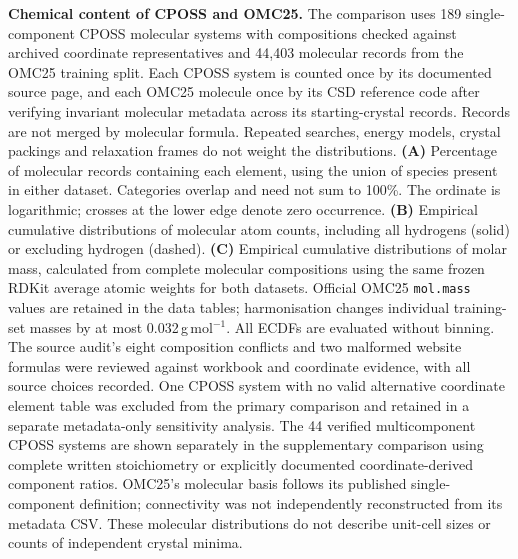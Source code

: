 \caption{\textbf{Chemical content of CPOSS and OMC25.} The comparison uses 189 single-component CPOSS molecular systems with compositions checked against archived coordinate representatives and 44,403 molecular records from the OMC25 training split. Each CPOSS system is counted once by its documented source page, and each OMC25 molecule once by its CSD reference code after verifying invariant molecular metadata across its starting-crystal records. Records are not merged by molecular formula. Repeated searches, energy models, crystal packings and relaxation frames do not weight the distributions. \textbf{(A)} Percentage of molecular records containing each element, using the union of species present in either dataset. Categories overlap and need not sum to 100\%. The ordinate is logarithmic; crosses at the lower edge denote zero occurrence. \textbf{(B)} Empirical cumulative distributions of molecular atom counts, including all hydrogens (solid) or excluding hydrogen (dashed). \textbf{(C)} Empirical cumulative distributions of molar mass, calculated from complete molecular compositions using the same frozen RDKit average atomic weights for both datasets. Official OMC25 \texttt{mol.mass} values are retained in the data tables; harmonisation changes individual training-set masses by at most 0.032\,g\,mol$^{-1}$. All ECDFs are evaluated without binning. The source audit's eight composition conflicts and two malformed website formulas were reviewed against workbook and coordinate evidence, with all source choices recorded. One CPOSS system with no valid alternative coordinate element table was excluded from the primary comparison and retained in a separate metadata-only sensitivity analysis. The 44 verified multicomponent CPOSS systems are shown separately in the supplementary comparison using complete written stoichiometry or explicitly documented coordinate-derived component ratios. OMC25's molecular basis follows its published single-component definition; connectivity was not independently reconstructed from its metadata CSV. These molecular distributions do not describe unit-cell sizes or counts of independent crystal minima.}
\label{fig:cposs_omc25_comparison}

